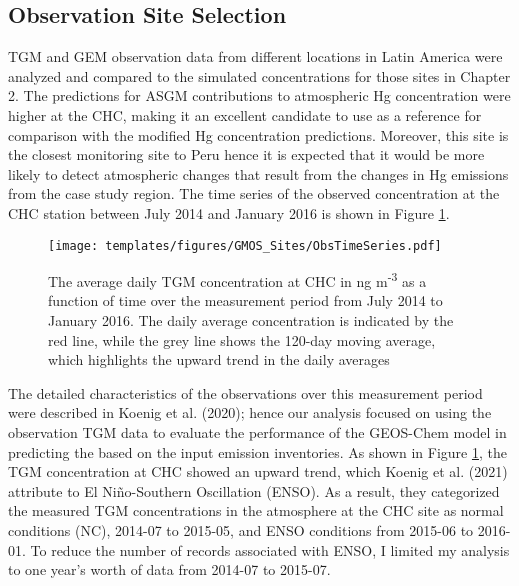 
\subsection{Observation Site Selection}

\begin{flushleft}
TGM and GEM observation data from different locations in Latin America were analyzed and compared to the \gc simulated \hg concentrations for those sites in Chapter 2. The \gc predictions for ASGM contributions to atmospheric Hg concentration were higher at the CHC, making it an excellent candidate to use as a reference for comparison with the modified \gc Hg concentration predictions. Moreover, this site is the closest monitoring site to Peru hence it is expected that it would be more likely to detect atmospheric \hg changes that result from the changes in Hg emissions from the case study region. The time series of the observed concentration at the CHC station between July 2014 and January 2016 is shown in Figure \ref{fig:chc_time_series}.
\end{flushleft}

\begin{figure}[H]
  \texttt{[image: templates/figures/GMOS\_Sites/ObsTimeSeries.pdf]}
 
  \caption[The average daily TGM concentration at CHC in ng m\textsuperscript{-3} as a function of time over the measurement period from July 2014 to January 2016.]{The average daily TGM concentration at CHC in ng m\textsuperscript{-3} as a function of time over the measurement period from July 2014 to January 2016. The daily average concentration is indicated by the red line, while the grey line shows the 120-day moving average, which highlights the upward trend in the daily averages}
  \label{fig:chc_time_series}
  \centering
\end{figure}
\FloatBarrier
\begin{flushleft}

The detailed characteristics of the observations over this measurement period were described in Koenig et al. (2020); hence our analysis focused on using the observation TGM data to evaluate the performance of the GEOS-Chem model in predicting the \hg based on the input \hg emission inventories. As shown in Figure \ref{fig:chc_time_series}, the TGM concentration at CHC showed an upward trend, which Koenig et al. (2021) attribute to El Ni\~no-Southern Oscillation (ENSO)\cite{koenig_seasonal_2021}. As a result, they categorized the measured TGM concentrations in the atmosphere at the CHC site as normal conditions (NC), 2014-07 to 2015-05, and ENSO conditions from 2015-06 to 2016-01. To reduce the number of records associated with ENSO, I limited my analysis to one year's worth of data from 2014-07 to 2015-07.
\end{flushleft}


